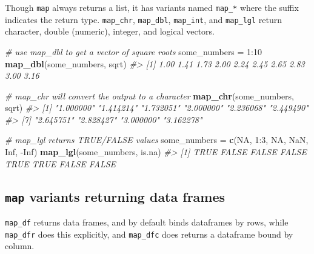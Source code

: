 \documentclass[]{book}
\newenvironment{Shaded}{}{}
\newcommand{\CommentTok}[1]{\textcolor[rgb]{0.38,0.63,0.69}{\textit{#1}}}
\newcommand{\DecValTok}[1]{\textcolor[rgb]{0.25,0.63,0.44}{#1}}
\newcommand{\KeywordTok}[1]{\textcolor[rgb]{0.00,0.44,0.13}{\textbf{#1}}}
\newcommand{\NormalTok}[1]{#1}
\newcommand{\OperatorTok}[1]{\textcolor[rgb]{0.40,0.40,0.40}{#1}}
\newcommand{\OtherTok}[1]{\textcolor[rgb]{0.00,0.44,0.13}{#1}}
\newcommand{\StringTok}[1]{\textcolor[rgb]{0.25,0.44,0.63}{#1}}
\begin{document}
Though \texttt{map} always returns a list, it has variants named \texttt{map\_*} where the suffix indicates the return type.
\texttt{map\_chr}, \texttt{map\_dbl}, \texttt{map\_int}, and \texttt{map\_lgl} return character, double (numeric), integer, and logical vectors.

\begin{Shaded}
\begin{Highlighting}[]
\CommentTok{# use map_dbl to get a vector of square roots}
\NormalTok{some_numbers =}\StringTok{ }\DecValTok{1}\OperatorTok{:}\DecValTok{10}
\KeywordTok{map_dbl}\NormalTok{(some_numbers, sqrt)}
\CommentTok{#>  [1] 1.00 1.41 1.73 2.00 2.24 2.45 2.65 2.83 3.00 3.16}

\CommentTok{# map_chr will convert the output to a character}
\KeywordTok{map_chr}\NormalTok{(some_numbers, sqrt)}
\CommentTok{#>  [1] "1.000000" "1.414214" "1.732051" "2.000000" "2.236068" "2.449490"}
\CommentTok{#>  [7] "2.645751" "2.828427" "3.000000" "3.162278"}

\CommentTok{# map_lgl returns TRUE/FALSE values}
\NormalTok{some_numbers =}\StringTok{ }\KeywordTok{c}\NormalTok{(}\OtherTok{NA}\NormalTok{, }\DecValTok{1}\OperatorTok{:}\DecValTok{3}\NormalTok{, }\OtherTok{NA}\NormalTok{, }\OtherTok{NaN}\NormalTok{, }\OtherTok{Inf}\NormalTok{, }\OperatorTok{-}\OtherTok{Inf}\NormalTok{)}
\KeywordTok{map_lgl}\NormalTok{(some_numbers, is.na)}
\CommentTok{#> [1]  TRUE FALSE FALSE FALSE  TRUE  TRUE FALSE FALSE}
\end{Highlighting}
\end{Shaded}

\hypertarget{map-variants-returning-data-frames}{%
\subsection{\texorpdfstring{\texttt{map} variants returning data frames}{map variants returning data frames}}\label{map-variants-returning-data-frames}}

\texttt{map\_df} returns data frames, and by default binds dataframes by rows, while \texttt{map\_dfr} does this explicitly, and \texttt{map\_dfc} does returns a dataframe bound by column.
\end{document}
